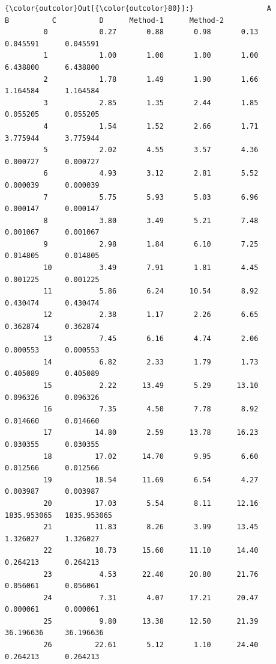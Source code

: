 \documentclass[11pt]{article}
\begin{document}
\begin{Verbatim}[commandchars=\\\{\}]
{\color{outcolor}Out[{\color{outcolor}80}]:}                 A          B          C          D      Method-1      Method-2
         0            0.27       0.88       0.98       0.13      0.045591      0.045591
         1            1.00       1.00       1.00       1.00      6.438800      6.438800
         2            1.78       1.49       1.90       1.66      1.164584      1.164584
         3            2.85       1.35       2.44       1.85      0.055205      0.055205
         4            1.54       1.52       2.66       1.71      3.775944      3.775944
         5            2.02       4.55       3.57       4.36      0.000727      0.000727
         6            4.93       3.12       2.81       5.52      0.000039      0.000039
         7            5.75       5.93       5.03       6.96      0.000147      0.000147
         8            3.80       3.49       5.21       7.48      0.001067      0.001067
         9            2.98       1.84       6.10       7.25      0.014805      0.014805
         10           3.49       7.91       1.81       4.45      0.001225      0.001225
         11           5.86       6.24      10.54       8.92      0.430474      0.430474
         12           2.38       1.17       2.26       6.65      0.362874      0.362874
         13           7.45       6.16       4.74       2.06      0.000553      0.000553
         14           6.82       2.33       1.79       1.73      0.405089      0.405089
         15           2.22      13.49       5.29      13.10      0.096326      0.096326
         16           7.35       4.50       7.78       8.92      0.014660      0.014660
         17          14.80       2.59      13.78      16.23      0.030355      0.030355
         18          17.02      14.70       9.95       6.60      0.012566      0.012566
         19          18.54      11.69       6.54       4.27      0.003987      0.003987
         20          17.03       5.54       8.11      12.16   1835.953065   1835.953065
         21          11.83       8.26       3.99      13.45      1.326027      1.326027
         22          10.73      15.60      11.10      14.40      0.264213      0.264213
         23           4.53      22.40      20.80      21.76      0.056061      0.056061
         24           7.31       4.07      17.21      20.47      0.000061      0.000061
         25           9.80      13.38      12.50      21.39     36.196636     36.196636
         26          22.61       5.12       1.10      24.40      0.264213      0.264213

\end{Verbatim}
\end{document}
